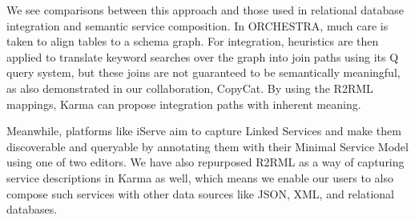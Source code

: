 We see comparisons between this approach and those used in relational database integration and semantic service composition.  
In ORCHESTRA\cite{ives2008orchestra}, much care is taken to align tables to a schema graph.  
For integration, heuristics are then applied to translate keyword searches over the graph into join paths using its Q query system, but these joins are not guaranteed to be semantically meaningful, as also demonstrated in our collaboration, CopyCat.  
By using the R2RML mappings, Karma can propose integration paths with inherent meaning.  

Meanwhile, platforms like iServe\cite{pedrinaci2010iserve} aim to capture Linked Services and make them discoverable and queryable by annotating them with their Minimal Service Model using one of two editors.
We have also repurposed R2RML as a way of capturing service descriptions in Karma as well\cite{taheriyan12:lapis}, which means we enable our users to also compose such services with other data sources like JSON, XML, and relational databases. 